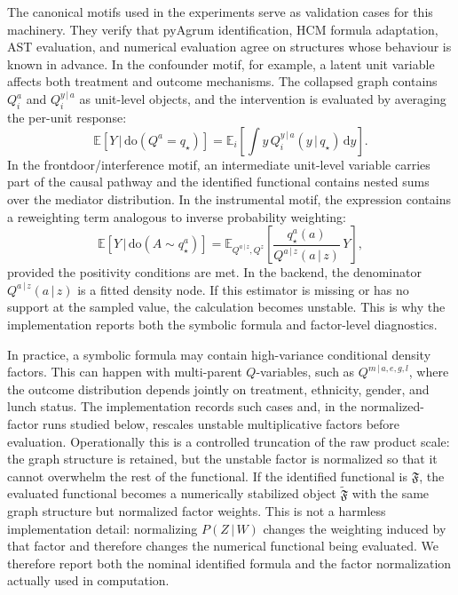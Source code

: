 \documentclass[unnumsec,webpdf,contemporary,large]{oup-authoring-template}%
\theoremstyle{thmstyleone}%
\theoremstyle{thmstyletwo}%
\theoremstyle{thmstylethree}%
\newcommand{\E}[1]{\mathbb{E}\left[#1\right]}
\newcommand{\EE}[2]{\mathbb{E}_{#1}\left[#2\right]}
\newcommand{\rmdo}{\mathrm{do}}
\newcommand{\g}{\,\vert\,}
\newcommand{\di}{\mathrm{d}}
\begin{document}
The canonical motifs used in the experiments serve as validation cases for this machinery.
They verify that pyAgrum identification, HCM formula adaptation, AST evaluation, and numerical evaluation agree on structures whose behaviour is known in advance.
In the confounder motif, for example, a latent unit variable affects both treatment and outcome mechanisms.
The collapsed graph contains $Q_i^a$ and $Q_i^{y\g a}$ as unit-level objects, and the intervention is evaluated by averaging the per-unit response:
\begin{equation}
  \E{Y\g \rmdo(Q^a=q_\star)}
  =
  \EE{i}{
    \int y\, Q_i^{y\g a}(y\g q_\star)\,\di y
  }.
  \label{eq:confounder-canonical}
\end{equation}
In the frontdoor/interference motif, an intermediate unit-level variable carries part of the causal pathway and the identified functional contains nested sums over the mediator distribution.
In the instrumental motif, the expression contains a reweighting term analogous to inverse probability weighting:
\begin{equation}
  \E{Y\g \rmdo(A\sim q_\star^a)}
  =
  \EE{Q^{a\g z},Q^z}{
    \frac{q_\star^a(a)}{Q^{a\g z}(a\g z)}\,Y
  },
  \label{eq:iv-canonical}
\end{equation}
provided the positivity conditions are met.
In the backend, the denominator $Q^{a\g z}(a\g z)$ is a fitted density node.
If this estimator is missing or has no support at the sampled value, the calculation becomes unstable.
This is why the implementation reports both the symbolic formula and factor-level diagnostics.

In practice, a symbolic formula may contain high-variance conditional density factors.
This can happen with multi-parent $Q$-variables, such as $Q^{m\g a,e,g,l}$, where the outcome distribution depends jointly on treatment, ethnicity, gender, and lunch status.
The implementation records such cases and, in the normalized-factor runs studied below, rescales unstable multiplicative factors before evaluation. Operationally this is a controlled truncation of the raw product scale: the graph structure is retained, but the unstable factor is normalized so that it cannot overwhelm the rest of the functional.
If the identified functional is $\mathfrak F$, the evaluated functional becomes a numerically stabilized object $\widetilde{\mathfrak F}$ with the same graph structure but normalized factor weights.
This is not a harmless implementation detail: normalizing $P(Z\g W)$ changes the weighting induced by that factor and therefore changes the numerical functional being evaluated.
We therefore report both the nominal identified formula and the factor normalization actually used in computation.
\end{document}
